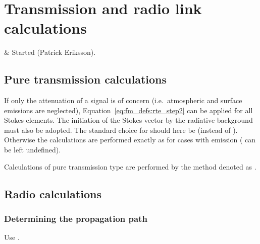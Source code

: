 \chapter{Transmission and radio link calculations}
 \label{sec:trans}


  & Started (Patrick Eriksson).\\
 \stophistory



\section{Pure transmission calculations}
\label{sec:transmission}

If only the attenuation of a signal is of concern (i.e.\ atmospheric and
surface emissions are neglected), Equation~\ref{eq:fm_defs:rte_step2} can be
applied for all Stokes elements. The initiation of the Stokes vector by the
radiative background must also be adopted. The standard choice for
 should here be 
(instead of ). Otherwise the calculations are performed
exactly as for cases with emission (
can be left undefined).

Calculations of pure transmission type are performed by the method denoted as
.




\section{Radio calculations}
\label{sec:radiolinks}


\subsection{Determining the propagation path}
\label{sec:radiolinks:ppath}

Use .


